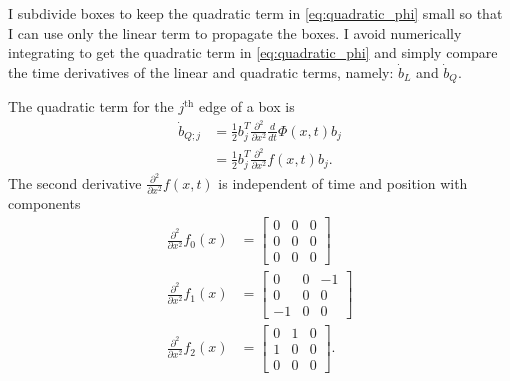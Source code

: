 \documentclass[12pt]{article}
\begin{document}
I subdivide boxes to keep the quadratic term in
\eqref{eq:quadratic_phi} small so that I can use only the linear term
to propagate the boxes.  I avoid numerically integrating to get the
quadratic term in \eqref{eq:quadratic_phi} and simply compare the time
derivatives of the linear and quadratic terms, namely: $\dot b_L$ and
$\dot b_Q$.

The quadratic term for the $j^{\text{th}}$ edge of a box is
\begin{subequations}
  \begin{align}
    \dot b_{Q;j} &= \frac{1}{2} b_j^T \frac{\partial^2}{\partial x^2}
               \frac{d}{dt} \Phi(x, t) b_j \\
             &= \frac{1}{2} b_j^T \frac{\partial^2}{\partial x^2}
               f(x,t) b_j.
  \end{align}
\end{subequations}
The second derivative $\frac{\partial^2}{\partial x^2} f(x,t)$ is
independent of time and position with components
\begin{subequations}
  \begin{align}
    \frac{\partial^2}{\partial x^2}
             f_0(x) &= 
                      \begin{bmatrix}
                        0 & 0 & 0 \\
                        0 & 0 & 0 \\
                        0 & 0 & 0
                      \end{bmatrix} \\
    \frac{\partial^2}{\partial x^2}
             f_1(x) &=
                      \begin{bmatrix}
                        0 & 0 & -1 \\
                        0 & 0 & 0 \\
                        -1 & 0 & 0
                      \end{bmatrix} \\
    \frac{\partial^2}{\partial x^2}
             f_2(x) &=
                      \begin{bmatrix}
                        0 & 1 & 0 \\
                        1 & 0 & 0 \\
                        0 & 0 & 0
                      \end{bmatrix}.
  \end{align}
\end{subequations}
\end{document}
